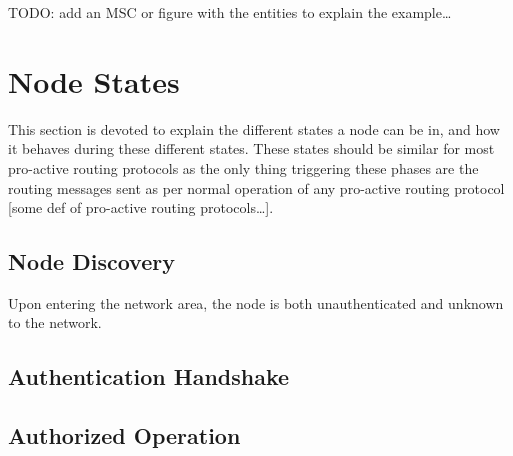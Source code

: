TODO: add an MSC or figure with the entities to explain the example\ldots

\section{Node States}
This section is devoted to explain the different states a node can be in, and
how it behaves during these different states. These states should be similar for
most pro-active routing protocols as the only thing triggering these phases are
the routing messages sent as per normal operation of any pro-active routing
protocol [some def of pro-active routing protocols\ldots].

\subsection{Node Discovery}
Upon entering the network area, the node is both unauthenticated and unknown to
the network.

\subsection{Authentication Handshake}

\subsection{Authorized Operation}